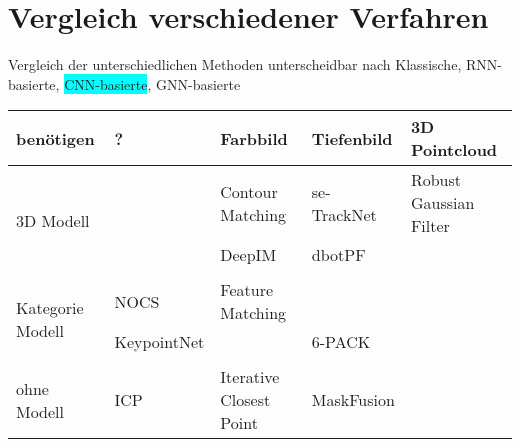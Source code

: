 \documentclass[a4paper, 11pt]{article}
\begin{document}
\section{Vergleich verschiedener Verfahren}
Vergleich der unterschiedlichen Methoden unterscheidbar nach \colorbox{Mahogany}{Klassische}, \colorbox{YellowOrange}{RNN-basierte}, \colorbox{Cyan}{CNN-basierte}, \colorbox{OliveGreen}{GNN-basierte}
\begin{table}
    \centering
    \begin{tabular}{p{1.5cm}|l|l|l|l}
        benötigen                             & ?                                     & Farbbild                                          & Tiefenbild                                        & 3D Pointcloud                               \\\hline
        \multirow{3}{1.5cm}{3D Modell}        &                                       & Contour Matching                                  & se-TrackNet\cite{se-TrackNet}                     & Robust Gaussian Filter\cite{GaussianFilter} \\
                                              &                                       & DeepIM\cite{Deepim}                               & dbotPF\cite{dbotPF}                               &                                             \\
                                              &                                       &                                                   &                                                   &                                             \\\hline
        \multirow{3}{1.5cm}{Kategorie Modell} & NOCS\cite{NormalizedObjectCoordiante} & Feature Matching                                  &                                                   &                                             \\
                                              & KeypointNet\cite{KeypointNet}         &                                                   & 6-PACK\cite{6pack}                                &                                             \\
                                              &                                       &                                                   &                                                   &                                             \\\hline
        \multirow{3}{1.5cm}{ohne Modell}      & ICP\cite{ICP}                         & Iterative Closest Point                           & MaskFusion\cite{MaskFusion}                       &                                             \\

\end{tabular}
\end{table}
\end{document}
